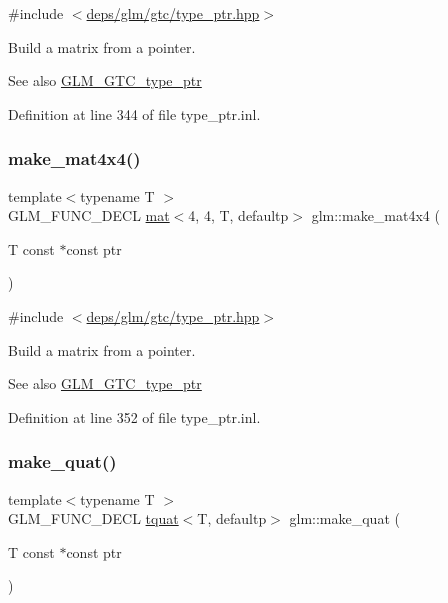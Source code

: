 {\ttfamily \#include $<$\hyperlink{type__ptr_8hpp}{deps/glm/gtc/type\+\_\+ptr.\+hpp}$>$}

Build a matrix from a pointer. \begin{DoxySeeAlso}{See also}
\hyperlink{group__gtc__type__ptr}{G\+L\+M\+\_\+\+G\+T\+C\+\_\+type\+\_\+ptr} 
\end{DoxySeeAlso}


Definition at line 344 of file type\+\_\+ptr.\+inl.

\mbox{\label{group__gtc__type__ptr_ga8f084be30e404844bfbb4a551ac2728c}} 
\subsubsection{\texorpdfstring{make\+\_\+mat4x4()}{make\_mat4x4()}}
{\footnotesize\ttfamily template$<$typename T $>$ \\
G\+L\+M\+\_\+\+F\+U\+N\+C\+\_\+\+D\+E\+CL \hyperlink{structglm_1_1mat}{mat}$<$4, 4, T, defaultp$>$ glm\+::make\+\_\+mat4x4 (\begin{DoxyParamCaption}\item[{T const $\ast$const}]{ptr }\end{DoxyParamCaption})}



{\ttfamily \#include $<$\hyperlink{type__ptr_8hpp}{deps/glm/gtc/type\+\_\+ptr.\+hpp}$>$}

Build a matrix from a pointer. \begin{DoxySeeAlso}{See also}
\hyperlink{group__gtc__type__ptr}{G\+L\+M\+\_\+\+G\+T\+C\+\_\+type\+\_\+ptr} 
\end{DoxySeeAlso}


Definition at line 352 of file type\+\_\+ptr.\+inl.

\mbox{\label{group__gtc__type__ptr_gaadafb6600af2633e4c98cc64c72f5269}} 
\subsubsection{\texorpdfstring{make\+\_\+quat()}{make\_quat()}}
{\footnotesize\ttfamily template$<$typename T $>$ \\
G\+L\+M\+\_\+\+F\+U\+N\+C\+\_\+\+D\+E\+CL \hyperlink{structglm_1_1tquat}{tquat}$<$T, defaultp$>$ glm\+::make\+\_\+quat (\begin{DoxyParamCaption}\item[{T const $\ast$const}]{ptr }\end{DoxyParamCaption})}



